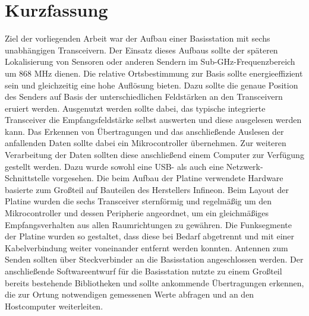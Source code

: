 
\chapter*{Kurzfassung}
\label{sec:kurzfassung}
\pagestyle{scrheadings}

Ziel der vorliegenden Arbeit war der Aufbau einer Basisstation mit sechs unabhängigen Transceivern. Der Einsatz dieses Aufbaus sollte der späteren Lokalisierung von Sensoren oder anderen Sendern im Sub-GHz-Frequenzbereich um 868 MHz dienen. Die relative Ortsbestimmung zur Basis sollte energieeffizient sein und gleichzeitig eine hohe Auflösung bieten. 
Dazu sollte die genaue Position des Senders auf Basis der unterschiedlichen Feldstärken an den Transceivern eruiert werden. Ausgenutzt werden sollte dabei, das typische integrierte Transceiver die Empfangsfeldstärke selbst auswerten und diese ausgelesen werden kann. Das Erkennen von Übertragungen und das anschließende Auslesen der anfallenden Daten sollte dabei ein Mikrocontroller übernehmen. Zur weiteren Verarbeitung der Daten sollten diese anschließend einem Computer zur Verfügung gestellt werden. Dazu wurde sowohl eine USB- als auch eine Netzwerk-Schnittstelle vorgesehen. Die beim Aufbau der Platine verwendete Hardware basierte zum Großteil auf Bauteilen des Herstellers Infineon. 
Beim Layout der Platine wurden die sechs Transceiver sternförmig und regelmäßig um den Mikrocontroller und dessen Peripherie angeordnet, um ein gleichmäßiges Empfangsverhalten aus allen Raumrichtungen zu gewähren. Die Funksegmente der Platine wurden so gestaltet, dass diese bei Bedarf abgetrennt und mit einer Kabelverbindung weiter voneinander entfernt werden konnten. Antennen zum Senden sollten über Steckverbinder an die Basisstation angeschlossen werden.
Der anschließende Softwareentwurf für die Basisstation nutzte zu einem Großteil bereits bestehende Bibliotheken und sollte ankommende Übertragungen erkennen, die zur Ortung notwendigen gemessenen Werte abfragen und an den Hostcomputer weiterleiten. 


